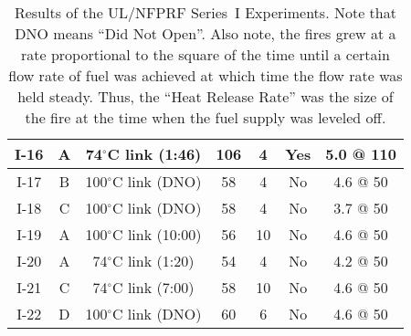 \begin{table}[h!]
\begin{center}
\begin{tabular}{|c||c|c|c|c|c|c|}
I-16  & A  & 74$^\circ$C link (1:46)    & 106           & 4         & Yes  & 5.0 @ 110 \\ \hline \hline
I-17  & B  & 100$^\circ$C link (DNO)    & 58            & 4         & No   & 4.6 @ 50 \\ \hline
I-18  & C  & 100$^\circ$C link (DNO)    & 58            & 4         & No   & 3.7 @ 50 \\ \hline
I-19  & A  & 100$^\circ$C link (10:00)  & 56            & 10        & No   & 4.6 @ 50 \\ \hline
I-20  & A  & 74$^\circ$C link (1:20)    & 54            & 4         & No   & 4.2 @ 50 \\ \hline
I-21  & C  & 74$^\circ$C link (7:00)    & 58            & 10        & No   & 4.6 @ 50 \\ \hline
I-22  & D  & 100$^\circ$C link (DNO)    & 60            & 6         & No   & 4.6 @ 50 \\ \hline
\end{tabular}
\end{center}
\caption[Results of the UL/NFPRF Experiments, Series~I.]
{Results of the UL/NFPRF Series~I Experiments. Note that DNO means
``Did Not Open''. Also note, the fires grew at a rate proportional
to the square of the time until a certain flow rate of fuel was achieved
at which time the flow rate was held steady. Thus, the ``Heat Release Rate''
was the size of the fire at the time when the fuel supply was leveled off.}
\label{ULmatrix}
\end{table}


